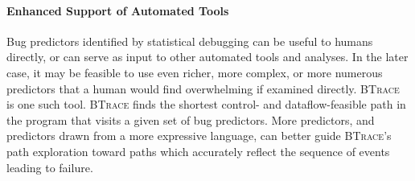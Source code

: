 \paragraph{Enhanced Support of Automated Tools}

Bug predictors identified by statistical debugging can be useful to humans directly, or can serve as input to other automated tools and analyses.  In the later case, it may be feasible to use even richer, more complex, or more numerous predictors that a human would find overwhelming if examined directly.  \textsc{BTrace}~\cite{Lal:2006:POPAD} is one such tool. \textsc{BTrace} finds the shortest control- and dataflow-feasible path in the program that visits a given set of bug predictors.  More predictors, and predictors drawn from a more expressive language, can better guide \textsc{BTrace}'s path exploration toward paths which accurately reflect the sequence of events leading to failure.
